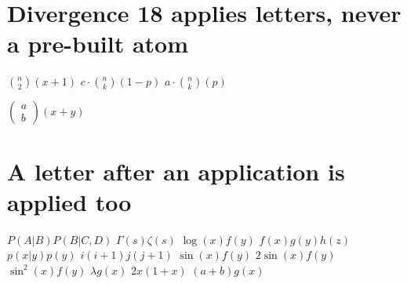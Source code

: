 \documentclass{article}
\begin{document}
\section{Divergence 18 applies letters, never a pre-built atom}
$\binom{n}{2}(x+1)$ $c\cdot\binom{n}{k}(1-p)$ $a\cdot{n\choose k}(p)$

$\begin{pmatrix}a\\b\end{pmatrix}(x+y)$

\section{A letter after an application is applied too}
$P(A|B)P(B|C,D)$ $\Gamma(s)\zeta(s)$ $\log(x)f(y)$ $f(x)g(y)h(z)$ $p(x|y)p(y)$ $i(i+1)j(j+1)$
$\sin(x)f(y)$ $2\sin(x)f(y)$ $\sin^2(x)f(y)$
$\lambda g(x)$ $2x(1+x)$ $(a+b)g(x)$

\end{document}

